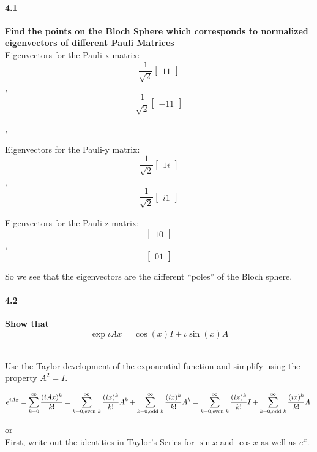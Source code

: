 \paragraph{4.1} \textbf{ Find the points on the Bloch Sphere which corresponds to normalized eigenvectors of different Pauli Matrices}
\\
Eigenvectors for the Pauli-x matrix: 
$$\frac{1}{\sqrt{2}}\begin{bmatrix}1 
1\end{bmatrix}$$ , $$\frac{1}{\sqrt{2}}\begin{bmatrix}-1 
1\end{bmatrix}$$ 
  
,   


Eigenvectors for the Pauli-y matrix:
$$\frac{1}{\sqrt{2}}\begin{bmatrix}1 
i\end{bmatrix}$$, $$\frac{1}{\sqrt{2}}\begin{bmatrix}i 
1\end{bmatrix}$$
  
  

Eigenvectors for the Pauli-z matrix: 
$$\begin{bmatrix}1 
0\end{bmatrix}$$,$$\begin{bmatrix}0 
1\end{bmatrix}$$
  
  

So we see that the eigenvectors are the different “poles” of the Bloch sphere. 

\paragraph{4.2} \textbf{Show that } $$\exp{\iota Ax} = \cos(x)I + \iota \sin(x) A$$

\\

Use the Taylor development of the exponential function and simplify using the property $A^2=I$.


$$e^{iAx}=\sum_{k=0}^\infty\frac{(iAx)^k}{k!}\\=\sum_{k=0,\text{even }k}^\infty\frac{(ix)^k}{k!}A^k+\sum_{k=0,\text{odd }k}^\infty\frac{(ix)^k}{k!}A^k\\=\sum_{k=0,\text{even }k}^\infty\frac{(ix)^k}{k!}I+\sum_{k=0,\text{odd }k}^\infty\frac{(ix)^k}{k!}A.$$

or
\\


First, write out the identities in Taylor's Series for $\sin x$ and $\cos x$ as well as $e^x$.

